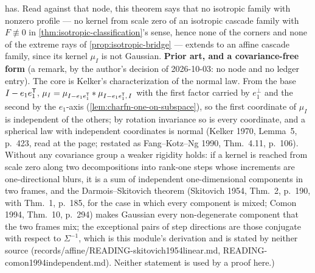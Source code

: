 \begin{theorem}
{has. Read against that node, this theorem says that no isotropic family with nonzero profile ---
no kernel from scale zero of an isotropic cascade family with $F \not\equiv 0$ in
\ref{thm:isotropic-classification}'s sense, hence none of the corners and none of the extreme rays
of \ref{prop:isotropic-bridge} --- extends to an affine cascade family, since its kernel $\mu_I$ is
not Gaussian. \textbf{Prior art, and a covariance-free form} (a remark, by the author's decision of
2026-10-03: no node and no ledger entry). The core is Kelker's characterization of the normal law.
From the base $I - e_1e_1^{\mathsf{T}}$, $\mu_I = \mu_{I - e_1e_1^{\mathsf{T}}} * \mu_{I - e_1e_1^{\mathsf{T}},\,I}$ with
the first factor carried by $e_1^\perp$ and the second by the $e_1$-axis
(\ref{lem:charfn-one-on-subspace}), so the first coordinate of $\mu_I$ is independent of the
others; by rotation invariance so is every coordinate, and a spherical law with independent
coordinates is normal (Kelker 1970, Lemma~5, p.~423, read at the page; restated as Fang--Kotz--Ng
1990, Thm.~4.11, p.~106). Without any covariance group a weaker rigidity holds: if a kernel is
reached from scale zero along two decompositions into rank-one steps whose increments are
one-directional blurs, it is a sum of independent one-dimensional components in two frames, and
the Darmois--Skitovich theorem (Skitovich 1954, Thm.~2, p.~190, with Thm.~1, p.~185, for the case
in which every component is mixed; Comon 1994, Thm.~10, p.~294) makes Gaussian every non-degenerate
component that the two frames mix; the exceptional pairs of step directions are
those conjugate with respect to $\Sigma^{-1}$, which is this module's derivation and is stated by
neither source (records/affine/READING-skitovich1954linear.md, READING-comon1994independent.md).
Neither statement is used by a proof here.)}
\end{theorem}

